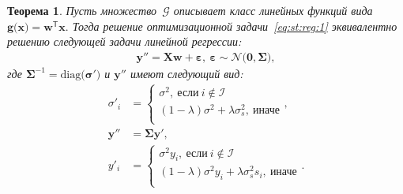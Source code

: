 \documentclass[12pt, twoside]{article}
\newtheorem{theorem}{Теорема}
\begin{document}
\begin{theorem}
\label{theorem:st:reg}
Пусть множество~$\mathcal{G}$ описывает класс линейных функций вида~$\mathbf{g}\bigr(\mathbf{x}\bigr) = \mathbf{w}^{\mathsf{T}}\mathbf{x}.$ Тогда решение оптимизационной задачи~\eqref{eq:st:reg:1} эквивалентно решению следующей задачи линейной регрессии:
\[
\label{eq:st:reg:th:st:1}
\begin{aligned}
\mathbf{y''} = \mathbf{X}\mathbf{w} + \bm{\varepsilon},~\bm{\varepsilon} \sim \mathcal{N}\bigr(\mathbf{0}, \bm{\Sigma}\bigr),
\end{aligned}
\]
где $\bm{\Sigma}^{-1}=\text{diag}\bigr(\bm{\sigma'}\bigr)$ и $\mathbf{y''}$ имеют следующий вид:
\[
\label{eq:st:reg:th:st:2}
\begin{aligned}
\sigma'_{i} &= \begin{cases}
\sigma^2,~\text{если}~i \not \in \mathcal{I}\\
\left(1-\lambda\right)\sigma^2+\lambda\sigma_s^2,~\text{иначе}\\
\end{cases}, \\
\mathbf{y''} &= \bm{\Sigma}\mathbf{y'},\\
y'_i &= \begin{cases}
\sigma^2y_i,~\text{если}~i \not \in \mathcal{I}\\
\left(1-\lambda\right)\sigma^2y_i+\lambda\sigma_s^2s_i,~\text{иначе}\\
\end{cases}.
\end{aligned}
\]
\end{theorem}
\end{document}
